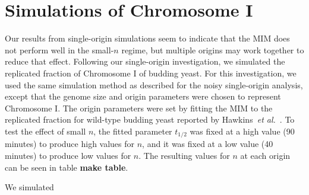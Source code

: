 		
	\section{Simulations of Chromosome I}
	\label{sec:ChromosomeI}
	
	Our results from single-origin simulations seem to indicate that the MIM does not perform well in the small-$n$ regime, but multiple origins may work together to reduce that effect.
	Following our single-origin investigation, we simulated the replicated fraction of Chromosome I of budding yeast.
	For this investigation, we used the same simulation method as described for the noisy single-origin analysis, except that the genome size and origin parameters were chosen to represent Chromosome I.
	The origin parameters were set by fitting the MIM to the replicated fraction for wild-type budding yeast reported by Hawkins~\emph{et al.}~\cite{StochasticTermination}.
	To test the effect of small $n$, the fitted parameter $t_{1/2}$ was fixed at a high value (90 minutes) to produce high values for $n$, and it was fixed at a low value (40 minutes) to produce low values for $n$.
	The resulting values for $n$ at each origin can be seen in table \textbf{make table}.
	
	We simulated
	







































